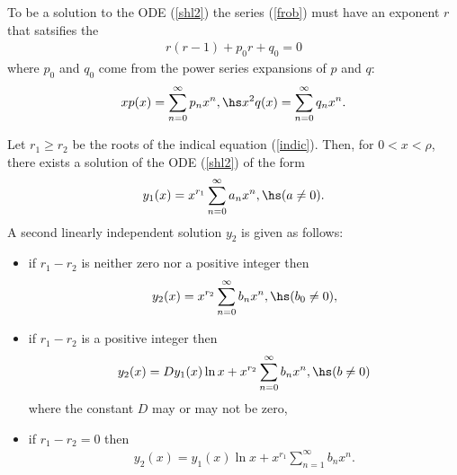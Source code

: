 \documentclass{article}
\begin{document}
\begin{theorem}
    To be a solution to the ODE (\ref{shl2}) the series (\ref{frob}) must
    have an exponent $r$ that satsifies the 
    \begin{align}
        \label{indic}
        r(r-1) + p_0r + q_0 = 0
    \end{align}
    where $p_0$ and $q_0$ come from the power series expansions of $p$
    and $q$:
    \begin{align*}
        xp(x) = \sum_{n=0}^\infty p_n x^n,\hs x^2q(x)=\sum_{n=0}^\infty q_nx^n.
    \end{align*}
\end{theorem}

\begin{theorem}
    Let $r_1\geq r_2$ be the roots of the indical equation (\ref{indic}).
    Then, for $0<x<\rho$, there exists a solution of the ODE (\ref{shl2}) of the
    form 
    \begin{align*}
        y_1(x)=x^{r_1} \sum_{n=0}^\infty a_nx^n,\hs(a\not=0).
    \end{align*} 
    A second linearly independent solution $y_2$ is given as follows:
    \begin{itemize}
        \item if $r_1-r_2$ is neither zero nor a positive integer then \begin{align*}
            y_2(x) = x^{r_2}\sum_{n=0}^\infty b_nx^n,\hs(b_0\not=0),
        \end{align*}
        \item if $r_1-r_2$ is a positive integer then \begin{align*}
            y_2(x) = Dy_1(x)\ln x + x^{r_2}\sum_{n=0}^\infty b_nx^n,\hs(b\not=0)
        \end{align*}
        where the constant $D$ may or may not be zero,
        \item if $r_1-r_2=0$ then \begin{align*}
            y_2(x) = y_1(x)\ln x + x^{r_1}\sum_{n=1}^\infty b_nx^n.
        \end{align*}
    \end{itemize}
\end{theorem}
\end{document}
